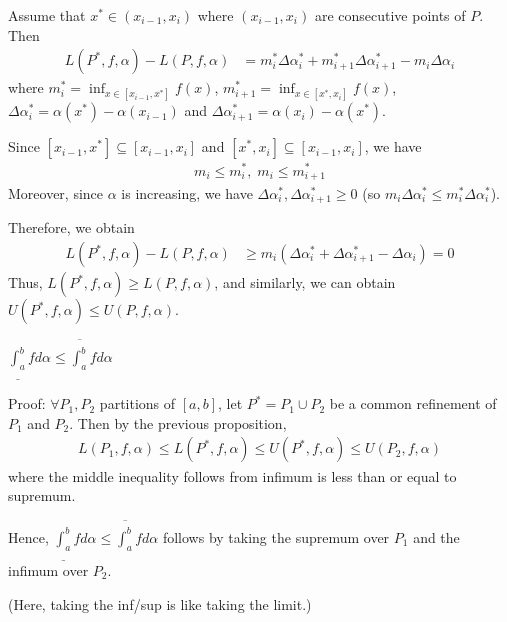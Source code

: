 \documentclass{tufte-handout}
\begin{document}
Assume that \( x^* \in (x_{i-1}, x_i) \) where \( (x_{i-1}, x_i) \) are
consecutive points of \( P \). Then
\begin{align}
    L(P^*, f, \alpha) - L(P, f, \alpha) 
    &= 
    m_i^* \Delta \alpha_i^* + m_{i+1}^* \Delta \alpha_{i+1}^* - m_i \Delta \alpha_i
\end{align}
where \( m_i^* = \inf_{x \in [x_{i-1}, x^*]}f(x) \), \( m_{i+1}^* = \inf_{x \in [x^*, x_i]}f(x) \),
\( \Delta \alpha_i^* = \alpha(x^*) - \alpha(x_{i-1}) \) and \( \Delta \alpha_{i+1}^* = \alpha(x_i) - \alpha(x^*) \).

Since \([x_{i-1}, x^*] \subseteq [x_{i-1}, x_i] \) and \( [x^*, x_i] \subseteq [x_{i-1}, x_i] \), we have
\begin{align}
    m_i \leq m_i^*, \; m_i \leq m_{i+1}^*
\end{align}
Moreover, since \( \alpha \) is increasing, we have \( 
\Delta \alpha_i^*, \Delta \alpha_{i+1}^* \geq 0 \) (so \( m_i \Delta \alpha_i^* \leq m_i^* \Delta \alpha_i^* \)).

Therefore, we obtain 
\begin{align}
    L(P^*, f, \alpha) - L(P, f, \alpha) 
    &\geq m_i(\Delta \alpha_i^* + \Delta \alpha_{i+1}^* - \Delta \alpha_i)=0
\end{align}
Thus, \( L(P^*, f, \alpha) \geq L(P, f, \alpha) \), and similarly, we can obtain 
\( U(P^*, f, \alpha) \leq U(P, f, \alpha) \).
\hfill\qedsymbol


\begin{Proposition}
    \( 
        \underline{\int_{a}^{b}}fd\alpha \leq \overline{
            \int_a^b
        }fd\alpha 
    \)
\end{Proposition}
Proof: \( \forall P_1, P_2 \) partitions of \([a,b]\), let \(P^* =  P_1 \cup P_2 \) be a common
refinement of \( P_1 \) and \( P_2 \). Then by the previous proposition,
\begin{align}
    L(P_1, f, \alpha) \leq L(P^*, f, \alpha) \leq U(P^*, f, \alpha) \leq U(P_2, f, \alpha)
\end{align}
where the middle inequality follows from infimum is less than or equal to supremum.

Hence, \(
        \underline{\int_{a}^{b}}fd\alpha \leq \overline{
            \int_a^b
        }fd\alpha \) 
        follows by taking 
the supremum over \( P_1 \) and the infimum over \( P_2 \).

(Here, taking the inf/sup is like taking the limit.)
\end{document}
